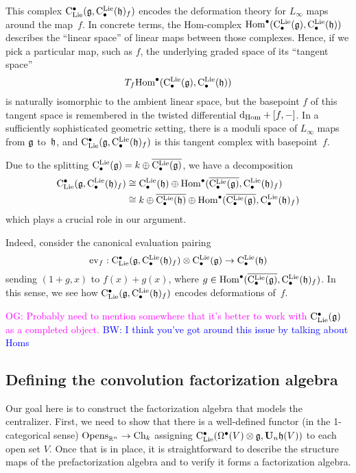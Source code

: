 \documentclass[11pt]{amsart}
\numberwithin{equation}{section}
\def\brian{\textcolor{blue}{BW: }\textcolor{blue}}
\def\owen{\textcolor{magenta}{OG: }\textcolor{magenta}}
\begin{document}
This complex ${\rm C}_{\rm Lie}^\bullet(\mathfrak g,{\rm C}^{\rm Lie}_\bullet(\mathfrak h)_f)$ encodes the deformation theory for $L_\infty$ maps around the map~$f$.
In concrete terms, the Hom-complex ${\rm Hom}^\bullet ({\rm C}^{\rm Lie}_\bullet(\mathfrak g), {\rm C}^{\rm Lie}_\bullet(\mathfrak h))$ describes the ``linear space'' of linear maps between those complexes.
Hence, if we pick a particular map, such as $f$, the underlying graded space of its ``tangent space''
\[
T_f {\rm Hom}^\bullet ({\rm C}^{\rm Lie}_\bullet(\mathfrak g), {\rm C}^{\rm Lie}_\bullet(\mathfrak h))
\]
is naturally isomorphic to the ambient linear space,
but the basepoint $f$ of this tangent space is remembered in the twisted differential ${\rm d}_{\rm Hom} + [f,-]$.
In a sufficiently sophisticated geometric setting, there is a moduli space of $L_\infty$ maps from $\mathfrak g$ to~$\mathfrak h$,
and ${\rm C}_{\rm Lie}^\bullet(\mathfrak g,{\rm C}^{\rm Lie}_\bullet(\mathfrak h)_f)$ is this tangent complex with basepoint~$f$.

Due to the splitting ${\rm C}^{\rm Lie}_\bullet(\mathfrak g) = k \oplus \overline{{\rm C}^{\rm Lie}_\bullet(\mathfrak g)}$,
we have a decomposition
\begin{align*}
{\rm C}_{\rm Lie}^\bullet(\mathfrak g,{\rm C}^{\rm Lie}_\bullet(\mathfrak h)_f) 
&\cong {\rm C}^{\rm Lie}_\bullet(\mathfrak h) \oplus {\rm Hom}^\bullet(\overline{{\rm C}^{\rm Lie}_\bullet(\mathfrak g)}, {\rm C}^{\rm Lie}_\bullet(\mathfrak h)_f)\\
&\cong k \oplus \overline{{\rm C}^{\rm Lie}_\bullet(\mathfrak h)} \oplus {\rm Hom}^\bullet(\overline{{\rm C}^{\rm Lie}_\bullet(\mathfrak g)}, {\rm C}^{\rm Lie}_\bullet(\mathfrak h)_f)
\end{align*}
which plays a crucial role in our argument.

Indeed, consider the canonical evaluation pairing
\[
{\rm ev}_{f}: {\rm C}_{\rm Lie}^\bullet(\mathfrak g,{\rm C}^{\rm Lie}_\bullet(\mathfrak h)_f) \otimes {\rm C}^{\rm Lie}_\bullet(\mathfrak g) \to {\rm C}^{\rm Lie}_\bullet(\mathfrak h)
\]
sending $(1 + g, x)$ to $f(x) + g(x)$, where $g \in {\rm Hom}^\bullet(\overline{{\rm C}^{\rm Lie}_\bullet(\mathfrak g)}, {\rm C}^{\rm Lie}_\bullet(\mathfrak h)_f)$.
In this sense, we see how ${\rm C}_{\rm Lie}^\bullet(\mathfrak g,{\rm C}^{\rm Lie}_\bullet(\mathfrak h)_f)$ encodes deformations of~$f$.

\owen{Probably need to mention somewhere that it's better to work with ${\rm C}_{\rm Lie}^\bullet(\mathfrak g)$ as a completed object.}
\brian{I think you've got around this issue by talking about Homs}

\subsection{Defining the convolution factorization algebra}
\label{sec: dfn of centralizer fact alg}

Our goal here is to construct the factorization algebra that models the centralizer.
First, we need to show that there is a well-defined functor (in the 1-categorical sense) ${\rm Opens}_{\mathbb R^n} \to {\rm Ch}_k$ assigning ${\rm C}_{\rm Lie}^\bullet(\Omega^\bullet(V) \otimes \mathfrak g, \mathbf U_n \mathfrak h(V))$ to each open set $V$.
Once that is in place, it is straightforward to describe the structure maps of the prefactorization algebra and to verify it forms a factorization algebra.
\end{document}
